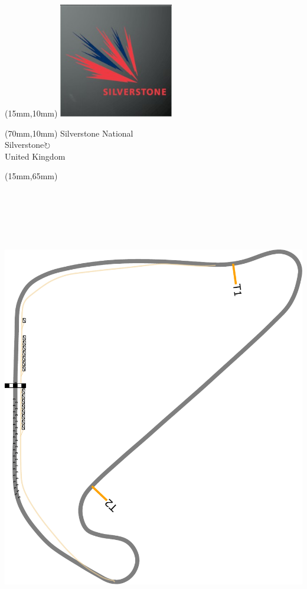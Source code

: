 \null\newpage
\begin{textblock*}{50mm}(15mm,10mm)%
\includegraphics[width=50mm]{LG/2015-05-20_00094.png}
\end{textblock*}
\begin{textblock*}{130mm}(70mm,10mm)%
{\fontsize{20}{20}\selectfont Silverstone National\\}
{\fontsize{16}{16}\selectfont Silverstone\hfill \Large$\circlearrowright$\\}
{\fontsize{12}{12}\selectfont United Kingdom\\}
\end{textblock*}
\begin{textblock*}{185mm}(15mm,65mm)%
\centering
\mbox{\includegraphics[width=185mm,height=210mm,keepaspectratio]{PT/SINA.pdf}}
\end{textblock*}
